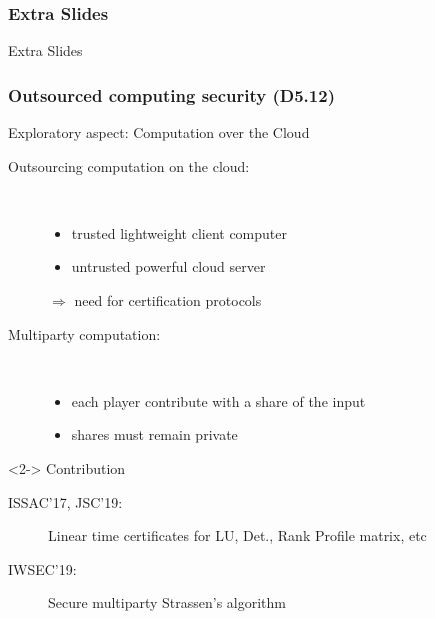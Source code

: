 \documentclass{beamer}
\begin{document}
\begin{frame}
  \frametitle{Extra Slides}

  \begin{center}
    \Large Extra Slides
  \end{center}
\end{frame}
\begin{frame}
  \frametitle{Outsourced computing security (D5.12)}

  \begin{block}{Exploratory aspect: Computation over the Cloud}
    \begin{description}
    \item[Outsourcing computation on the cloud:]\ 
      \begin{itemize}
      \item trusted lightweight client computer
      \item untrusted powerful cloud server
      \end{itemize}
      $\Rightarrow$ need for certification protocols
    \item[Multiparty computation:] \
      \begin{itemize}
      \item each player contribute with a share of the input
      \item shares must remain private
      \end{itemize}
    \end{description}
\end{block}
  \begin{block}<2->
      {Contribution}
      \begin{description}
        \item[ISSAC'17, JSC'19:] Linear time certificates for LU, Det., Rank Profile  matrix, etc
        \item[IWSEC'19:] Secure multiparty Strassen's algorithm
      \end{description}
  \end{block}

\end{frame}
\end{document}
